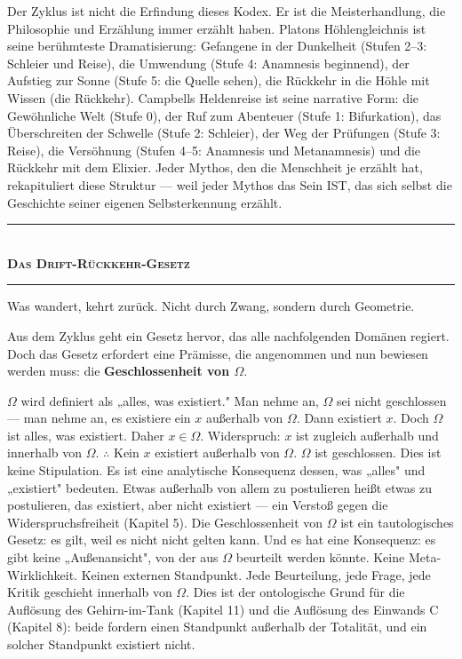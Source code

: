 \documentclass[10pt, openany, oneside]{book}
\renewcommand{\normalsize}{\fontsize{10}{13}\selectfont}
\begin{document}
Der Zyklus ist nicht die Erfindung dieses Kodex. Er ist die Meisterhandlung, die Philosophie und Erzählung immer erzählt haben. Platons Höhlengleichnis ist seine berühmteste Dramatisierung: Gefangene in der Dunkelheit (Stufen 2--3: Schleier und Reise), die Umwendung (Stufe 4: Anamnesis beginnend), der Aufstieg zur Sonne (Stufe 5: die Quelle sehen), die Rückkehr in die Höhle mit Wissen (die Rückkehr). Campbells Heldenreise ist seine narrative Form: die Gewöhnliche Welt (Stufe 0), der Ruf zum Abenteuer (Stufe 1: Bifurkation), das Überschreiten der Schwelle (Stufe 2: Schleier), der Weg der Prüfungen (Stufe 3: Reise), die Versöhnung (Stufen 4--5: Anamnesis und Metanamnesis) und die Rückkehr mit dem Elixier. Jeder Mythos, den die Menschheit je erzählt hat, rekapituliert diese Struktur --- weil jeder Mythos das Sein IST, das sich selbst die Geschichte seiner eigenen Selbsterkennung erzählt.

\vspace{1.5em}


\begin{center}
    \rule{0.3\textwidth}{0.4pt}\\[0.5em]
    {\normalsize\bfseries\scshape Das Drift-Rückkehr-Gesetz}\\[0.3em]
    \rule{0.3\textwidth}{0.4pt}
\end{center}

\vspace{1em}

\noindent Was wandert, kehrt zurück. Nicht durch Zwang, sondern durch Geometrie.

Aus dem Zyklus geht ein Gesetz hervor, das alle nachfolgenden Domänen regiert. Doch das Gesetz erfordert eine Prämisse, die angenommen und nun bewiesen werden muss: die \textbf{Geschlossenheit von $\Omega$}.

$\Omega$ wird definiert als „alles, was existiert." Man nehme an, $\Omega$ sei nicht geschlossen --- man nehme an, es existiere ein $x$ außerhalb von $\Omega$. Dann existiert $x$. Doch $\Omega$ ist alles, was existiert. Daher $x \in \Omega$. Widerspruch: $x$ ist zugleich außerhalb und innerhalb von $\Omega$. $\therefore$ Kein $x$ existiert außerhalb von $\Omega$. $\Omega$ ist geschlossen. Dies ist keine Stipulation. Es ist eine analytische Konsequenz dessen, was „alles" und „existiert" bedeuten. Etwas außerhalb von allem zu postulieren heißt etwas zu postulieren, das existiert, aber nicht existiert --- ein Verstoß gegen die Widerspruchsfreiheit (Kapitel 5). Die Geschlossenheit von $\Omega$ ist ein tautologisches Gesetz: es gilt, weil es nicht nicht gelten kann. Und es hat eine Konsequenz: es gibt keine „Außenansicht", von der aus $\Omega$ beurteilt werden könnte. Keine Meta-Wirklichkeit. Keinen externen Standpunkt. Jede Beurteilung, jede Frage, jede Kritik geschieht innerhalb von $\Omega$. Dies ist der ontologische Grund für die Auflösung des Gehirn-im-Tank (Kapitel 11) und die Auflösung des Einwands C (Kapitel 8): beide fordern einen Standpunkt außerhalb der Totalität, und ein solcher Standpunkt existiert nicht.
\end{document}
